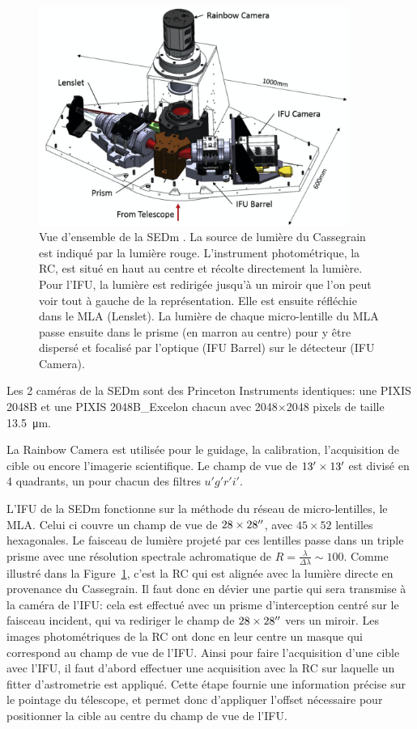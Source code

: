 \documentclass[../main/main.tex]{subfiles}
\begin{document}
\begin{figure}[h]
  \centering
  \includegraphics[width=0.9\textwidth]{../figures/03_sedm/sedmoverview.png}
  \caption[Vue d'ensemble de la SEDm]{Vue d'ensemble de la SEDm
    \citep{SEDM18}. La source de lumière du Cassegrain est indiqué par
    la lumière rouge. L'instrument photométrique, la RC, est situé en
    haut au centre et récolte directement la lumière. Pour l'IFU, la
    lumière est redirigée jusqu'à un miroir que l'on peut voir tout à
    gauche de la représentation. Elle est ensuite réfléchie dans le MLA
    (Lenslet). La lumière de chaque micro-lentille du MLA passe ensuite
    dans le prisme (en marron au centre) pour y être dispersé et
    focalisé par l'optique (IFU Barrel) sur le détecteur (IFU Camera).}
  \label{fig:sedmoverview}
\end{figure}

Les 2 caméras de la SEDm sont des Princeton Instruments identiques:
une PIXIS 2048B et une PIXIS 2048B\_Excelon chacun avec 2048$\times$2048
pixels de taille \SI{13.5}{\micro\metre}.

La Rainbow Camera est utilisée pour le guidage, la calibration,
l'acquisition de cible ou encore l'imagerie scientifique. Le champ de
vue de $13^\prime\times13^\prime$ est divisé en 4 quadrants, un pour
chacun des filtres $u'g'r'i'$.

L'IFU de la SEDm fonctionne sur la méthode du réseau de micro-lentilles,
le MLA. Celui ci couvre un champ de vue de $28\times28^{\prime\prime}$, avec
$45\times52$ lentilles hexagonales. Le faisceau de lumière projeté par
ces lentilles passe dans un triple prisme avec une résolution spectrale
achromatique de $R=\frac{\lambda}{\Delta\lambda}\sim100$.
Comme illustré dans la Figure~\ref{fig:sedmoverview}, c'est la RC qui
est alignée avec la lumière directe en provenance du Cassegrain. Il faut donc en dévier une
partie qui sera transmise à la caméra de l'IFU: cela est effectué avec un
prisme d'interception centré sur le faisceau incident, qui va rediriger
le champ de $28\times28^{\prime\prime}$ vers un miroir. Les images
photométriques de la RC ont donc en leur centre un masque qui correspond
au champ de vue de l'IFU. Ainsi pour faire l'acquisition d'une cible
avec l'IFU, il faut d'abord effectuer une acquisition avec la RC sur
laquelle un fitter d'astrometrie est appliqué. Cette étape fournie une
information précise sur le pointage du télescope, et permet donc
d'appliquer l'offset nécessaire pour positionner la cible au centre du
champ de vue de l'IFU.
\end{document}
